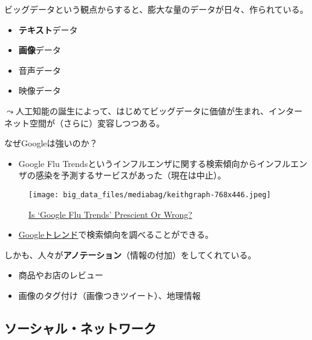 \documentclass[
  xelatex,
  ja=standard]{bxjsarticle}
\providecommand{\tightlist}{%
  \setlength{\itemsep}{0pt}\setlength{\parskip}{0pt}}\usepackage{longtable,booktabs,array}
\begin{document}
ビッグデータという観点からすると、膨大な量のデータが日々、作られている。

\begin{itemize}
\tightlist
\item
  \textbf{テキスト}データ
\item
  \textbf{画像}データ
\item
  音声データ
\item
  映像データ
\end{itemize}

\(\leadsto\)人工知能の誕生によって、はじめてビッグデータに価値が生まれ、インターネット空間が（さらに）変容しつつある。

なぜGoogleは強いのか？

\begin{itemize}
\tightlist
\item
  Google Flu
  Trendsというインフルエンザに関する検索傾向からインフルエンザの感染を予測するサービスがあった（現在は中止）。
\end{itemize}

\begin{figure}[htpb]

{\centering \texttt{[image: big\_data\_files/mediabag/keithgraph-768x446.jpeg]}

}

\caption{\href{https://www.wbur.org/news/2013/01/13/google-flu-trends-cdc}{Is
`Google Flu Trends' Prescient Or Wrong?}}

\end{figure}

\begin{itemize}
\tightlist
\item
  \href{https://trends.google.co.jp/trends/}{Googleトレンド}で検索傾向を調べることができる。
\end{itemize}

しかも、人々が\textbf{アノテーション}（情報の付加）をしてくれている。

\begin{itemize}
\tightlist
\item
  商品やお店のレビュー
\item
  画像のタグ付け（画像つきツイート）、地理情報
\end{itemize}

\hypertarget{ux30bdux30fcux30b7ux30e3ux30ebux30cdux30c3ux30c8ux30efux30fcux30af}{%
\subsection{ソーシャル・ネットワーク}\label{ux30bdux30fcux30b7ux30e3ux30ebux30cdux30c3ux30c8ux30efux30fcux30af}}
\end{document}
